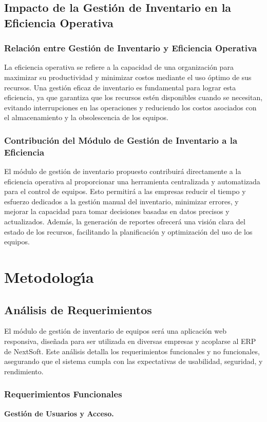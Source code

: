 \documentclass[stu, 12pt, letterpaper, donotrepeattitle, floatsintext, natbib]{apa7}
\begin{document}
\subsection{Impacto de la Gesti\'on de Inventario en la Eficiencia Operativa}
\subsubsection{Relaci\'on entre Gesti\'on de Inventario y Eficiencia Operativa}
La eficiencia operativa se refiere a la capacidad de una organizaci\'on para maximizar su productividad y minimizar costos mediante el uso \'optimo de sus recursos. Una gesti\'on eficaz de inventario es fundamental para lograr esta
eficiencia, ya que garantiza que los recursos est\'en disponibles cuando se necesitan, evitando interrupciones en las operaciones y reduciendo los costos asociados con el almacenamiento y la obsolescencia de los equipos.
\subsubsection{Contribuci\'on del M\'odulo de Gesti\'on de Inventario a la Eficiencia}
El m\'odulo de gesti\'on de inventario propuesto contribuir\'a directamente a la eficiencia operativa al proporcionar una herramienta centralizada y automatizada para el control de equipos. Esto permitir\'a a las empresas reducir el
tiempo y esfuerzo dedicados a la gesti\'on manual del inventario, minimizar errores, y mejorar la capacidad para tomar decisiones basadas en datos precisos y actualizados. Adem\'as, la generaci\'on de reportes ofrecer\'a
una visi\'on clara del estado de los recursos, facilitando la planificaci\'on y optimizaci\'on del uso de los equipos.
\newpage
\section{Metodolog\'{\i}a}
\subsection{An\'alisis de Requerimientos}
El m\'odulo de gesti\'on de inventario de equipos ser\'a una aplicaci\'on web responsiva, dise\~{n}ada para ser utilizada en diversas empresas y acoplarse al ERP de NextSoft. Este an\'alisis detalla los requerimientos funcionales y no funcionales,
asegurando que el sistema cumpla con las expectativas de usabilidad, seguridad, y rendimiento.
\subsubsection{Requerimientos Funcionales}
\textbf{Gesti\'on de Usuarios y Acceso.}
\end{document}
